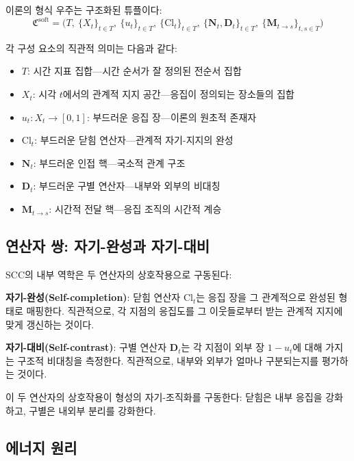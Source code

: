 이론의 형식 우주는 구조화된 튜플이다:
\begin{equation}
    \mathfrak{C}^{\mathrm{soft}} = \Big( T,\ \{X_t\}_{t \in T},\ \{u_t\}_{t \in T},\ \{\mathrm{Cl}_t\}_{t \in T},\ \{\mathbf{N}_t, \mathbf{D}_t\}_{t \in T},\ \{\mathbf{M}_{t \to s}\}_{t,s \in T} \Big)
    \label{eq:formal-universe}
\end{equation}

각 구성 요소의 직관적 의미는 다음과 같다:
\begin{itemize}
    \item $T$: 시간 지표 집합---시간 순서가 잘 정의된 전순서 집합
    \item $X_t$: 시각 $t$에서의 관계적 지지 공간---응집이 정의되는 장소들의 집합
    \item $u_t : X_t \to [0,1]$: 부드러운 응집 장---이론의 원초적 존재자
    \item $\mathrm{Cl}_t$: 부드러운 닫힘 연산자---관계적 자기-지지의 완성
    \item $\mathbf{N}_t$: 부드러운 인접 핵---국소적 관계 구조
    \item $\mathbf{D}_t$: 부드러운 구별 연산자---내부와 외부의 비대칭
    \item $\mathbf{M}_{t \to s}$: 시간적 전달 핵---응집 조직의 시간적 계승
\end{itemize}


\subsection{연산자 쌍: 자기-완성과 자기-대비}

SCC의 내부 역학은 두 연산자의 상호작용으로 구동된다:

\textbf{자기-완성(Self-completion)}: 닫힘 연산자 $\mathrm{Cl}_t$는 응집 장을 그 관계적으로 완성된 형태로 매핑한다. 직관적으로, 각 지점의 응집도를 그 이웃들로부터 받는 관계적 지지에 맞게 갱신하는 것이다.

\textbf{자기-대비(Self-contrast)}: 구별 연산자 $\mathbf{D}_t$는 각 지점이 외부 장 $1-u_t$에 대해 가지는 구조적 비대칭을 측정한다. 직관적으로, 내부와 외부가 얼마나 구분되는지를 평가하는 것이다.

이 두 연산자의 상호작용이 형성의 자기-조직화를 구동한다: 닫힘은 내부 응집을 강화하고, 구별은 내외부 분리를 강화한다.


\subsection{에너지 원리}

